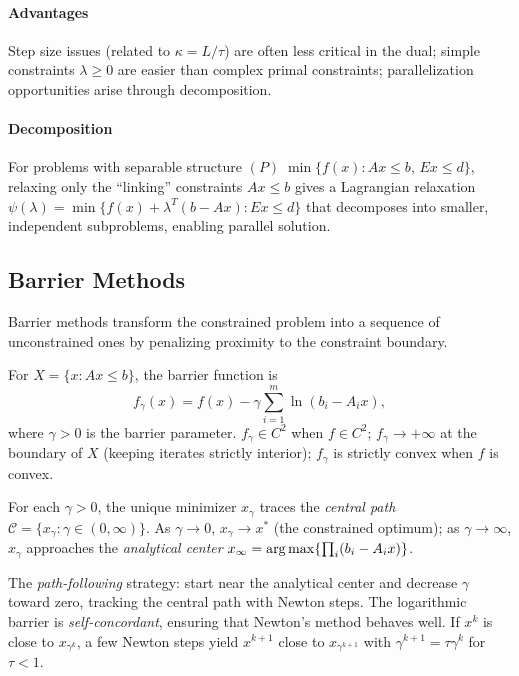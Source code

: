 \paragraph{Advantages}

Step size issues (related to $\kappa = L/\tau$) are often less critical in the dual; simple constraints $\lambda \geq 0$ are easier than complex primal constraints; parallelization opportunities arise through decomposition.

\paragraph{Decomposition}

For problems with separable structure $(P)\; \min\{f(x) : Ax \leq b,\, Ex \leq d\}$, relaxing only the ``linking'' constraints $Ax \leq b$ gives a Lagrangian relaxation $\psi(\lambda) = \min\{f(x) + \lambda^T(b - Ax) : Ex \leq d\}$ that decomposes into smaller, independent subproblems, enabling parallel solution.


\subsection{Barrier Methods}\label{sec:barrier}

Barrier methods transform the constrained problem into a sequence of unconstrained ones by penalizing proximity to the constraint boundary.

\begin{definition}\label{def:barrier}
	For $X = \{x : Ax \leq b\}$, the barrier function is
	\begin{equation}\label{eq:log-barrier}
		f_\gamma(x) = f(x) - \gamma \sum_{i=1}^{m} \ln(b_i - A_i x),
	\end{equation}
	where $\gamma > 0$ is the barrier parameter.
	$f_\gamma \in C^2$ when $f \in C^2$; $f_\gamma \to +\infty$ at the boundary of $X$ (keeping iterates strictly interior); $f_\gamma$ is strictly convex when $f$ is convex.
\end{definition}

For each $\gamma > 0$, the unique minimizer $x_\gamma$ traces the \emph{central path} $\mathcal{C} = \{x_\gamma : \gamma \in (0, \infty)\}$.
As $\gamma \to 0$, $x_\gamma \to x^*$ (the constrained optimum); as $\gamma \to \infty$, $x_\gamma$ approaches the \emph{analytical center} $x_\infty = \operatorname*{arg\,max}\{\prod_i (b_i - A_i x)\}$.

The \emph{path-following} strategy: start near the analytical center and decrease $\gamma$ toward zero, tracking the central path with Newton steps.
The logarithmic barrier is \emph{self-concordant}, ensuring that Newton's method behaves well.
If $x^k$ is close to $x_{\gamma^k}$, a few Newton steps yield $x^{k+1}$ close to $x_{\gamma^{k+1}}$ with $\gamma^{k+1} = \tau \gamma^k$ for $\tau < 1$.

